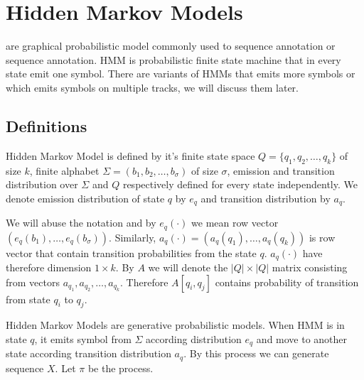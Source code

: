\chapter{Hidden Markov Models}

 are graphical probabilistic model
commonly used to sequence annotation or sequence annotation. HMM is
probabilistic finite state machine that in every state emit one symbol. There
are variants of HMMs that emits more symbols or which emits symbols on multiple
tracks, we will discuss them later.

\section{Definitions}


Hidden Markov Model is defined by it's finite state space $Q=\{q_1,q_2,\dots,
q_k\}$ of size $k$, finite alphabet $\Sigma=(b_1,b_2,\dots,b_{\sigma})$ of size
$\sigma$, emission and transition distribution over $\Sigma$ and $Q$
respectively defined for every state independently. We denote emission
distribution of state $q$ by $e_q$ and transition distribution by
$a_{q}$. 

We will abuse the notation and by $e_q(\cdot)$ we mean row vector
$\left(e_q(b_1),\dots,e_q(b_{\sigma})\right)$. Similarly,
$a_q(\cdot)=\left(a_q(q_1),\dots,a_q(q_k)\right)$ is row vector that contain
transition probabilities from the state $q$.  $a_q(\cdot)$ have therefore
dimension $1\times k$. By $A$ we will denote the $|Q|\times |Q|$ matrix
consisting from vectors $a_{q_1},a_{q_2},\dots,a_{q_k}$.  Therefore
$A[q_i,q_j]$ contains probability of transition from state $q_i$ to $q_j$.

Hidden Markov Models are generative probabilistic models. When HMM is in state
$q$, it emits symbol from $\Sigma$ according distribution $e_q$ and move to
another state according transition distribution $a_q$. By this process we can
generate sequence $X$. Let $\pi$ be the process.




\section{}
